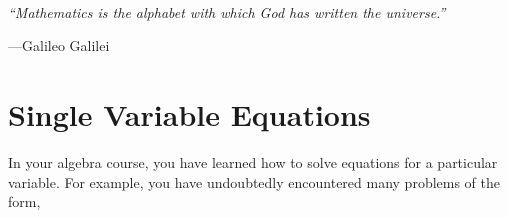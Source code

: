 


\vspace*{-0.2in} %
\noindent
{} 
\makebox[0.25\textwidth][l]{\hrulefill}\\[0.25cm]
\hfill 
{}\hfill
\makebox[0.25\textwidth][l]{ \texttt{\underline\coursename}}\hfill \\[0.25cm]
\makebox[0.65\textwidth]{}\hfill
\makebox[0.25\textwidth][l]{\enspace\texttt{\underline{\term\ \courseyear}}}\hfill 
\vspace{0.5in} %

\begin{centering}
\noindent\textbf{\Large \worksheetname} \\[0.1in]
\end{centering}
\vspace{0.1in}
\epigraph{\itshape``Mathematics is the alphabet with which God has written the universe.''}{---Galileo Galilei}
\qsp
\section{Single Variable Equations}
In your algebra course, you have learned how to solve equations for a particular variable. For example, you have undoubtedly encountered many problems of the form,  
\qsp

